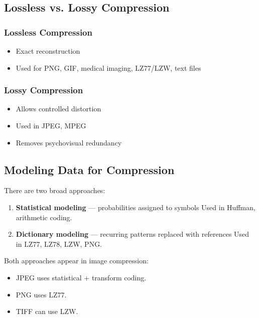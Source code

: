\documentclass{AnantDocumentation}
\begin{document}
\subsection{Lossless vs. Lossy Compression}

\subsubsection{Lossless Compression}

\begin{itemize}
\item Exact reconstruction
\item Used for PNG, GIF, medical imaging, LZ77/LZW, text files
\end{itemize}

\subsubsection{Lossy Compression}

\begin{itemize}
\item Allows controlled distortion
\item Used in JPEG, MPEG
\item Removes psychovisual redundancy
\end{itemize}

\subsection{Modeling Data for Compression}

There are two broad approaches:

\begin{enumerate}
\item \textbf{Statistical modeling} — probabilities assigned to symbols  
Used in Huffman, arithmetic coding.

\item \textbf{Dictionary modeling} — recurring patterns replaced with references  
Used in LZ77, LZ78, LZW, PNG.
\end{enumerate}

Both approaches appear in image compression:

\begin{itemize}
\item JPEG uses statistical + transform coding.
\item PNG uses LZ77.
\item TIFF can use LZW.
\end{itemize}
\end{document}
